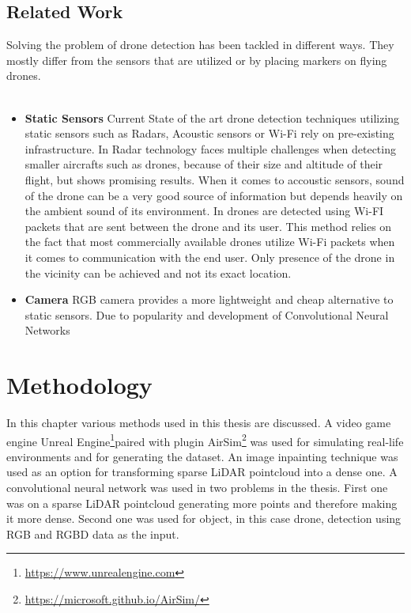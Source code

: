 \documentclass[twoside]{ctuthesis}
\theoremstyle{plain}
\theoremstyle{definition}
\theoremstyle{note}
\begin{document}
\section{Related Work}
Solving the problem of drone detection has been tackled in different ways. They mostly differ from the sensors that are utilized or by placing markers on flying drones.\\
\\
\begin{itemize}
	\item \textbf{Static Sensors} Current State of the art drone detection techniques utilizing static sensors such as Radars, Acoustic sensors or Wi-Fi rely on pre-existing infrastructure. In \cite{8337899} Radar technology faces multiple challenges when detecting smaller aircrafts such as drones, because of their size and altitude of their flight, but shows promising results. When it comes to accoustic sensors, sound of the drone can be a very good source of information but depends heavily on the ambient sound of its environment\cite{8337899}. In \cite{drone-det-wifi} drones are detected using Wi-FI packets that are sent between the drone and its user. This method relies on the fact that most commercially available drones utilize Wi-Fi packets when it comes to communication with the end user. Only presence of the drone in the vicinity can be achieved and not its exact location.
	\item \textbf{Camera} RGB camera provides a more lightweight and cheap alternative to static sensors. Due to popularity and development of Convolutional Neural Networks 
\end{itemize}
\chapter{Methodology}
In this chapter various methods used in this thesis are discussed. A video game engine Unreal Engine\footnote{\url{https://www.unrealengine.com}}paired with plugin AirSim\footnote{\url{https://microsoft.github.io/AirSim/}} was used for simulating real-life environments and for generating the dataset. An image inpainting technique was used as an option for transforming sparse LiDAR pointcloud into a dense one. A convolutional neural network was used in two problems in the thesis. First one was on a sparse LiDAR pointcloud generating more points and therefore making it more dense. Second one was used for object, in this case drone, detection using RGB and RGBD data as the input.
\end{document}
